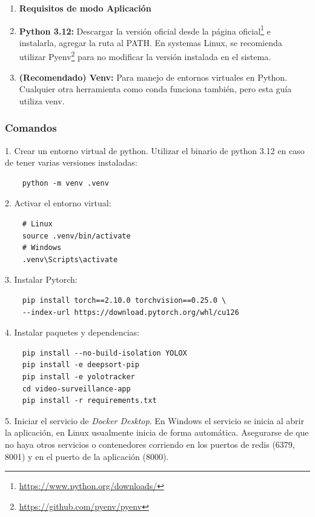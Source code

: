 \documentclass[11pt,a4paper]{article}
\begin{document}
\begin{enumerate}
    \item \textbf{Requisitos de modo Aplicación}
    \item \textbf{Python 3.12:} Descargar la versión oficial desde la página oficial\footnote{\url{https://www.python.org/downloads/}} e instalarla, agregar la ruta al PATH. En systemas Linux, se recomienda utilizar Pyenv\footnote{\url{https://github.com/pyenv/pyenv}} para no modificar la versión instalada en el sistema.
    \item \textbf{(Recomendado) Venv:} Para manejo de entornos virtuales en Python. Cualquier otra herramienta como conda funciona también, pero esta guía utiliza venv.
\end{enumerate}

\subsubsection{Comandos}

1. Crear un entorno virtual de python. Utilizar el binario de python 3.12 en caso de tener varias versiones instaladas:

\begin{verbatim}
    python -m venv .venv
\end{verbatim}

2. Activar el entorno virtual:

\begin{verbatim}
    # Linux
    source .venv/bin/activate
    # Windows
    .venv\Scripts\activate
\end{verbatim}

3. Instalar Pytorch:

\begin{verbatim}
    pip install torch==2.10.0 torchvision==0.25.0 \
    --index-url https://download.pytorch.org/whl/cu126
\end{verbatim}

4. Instalar paquetes y dependencias:

\begin{verbatim}
    pip install --no-build-isolation YOLOX
    pip install -e deepsort-pip
    pip install -e yolotracker
    cd video-surveillance-app
    pip install -r requirements.txt
\end{verbatim}

5. Iniciar el servicio de \textit{Docker Desktop}. En Windows el servicio se inicia al abrir la aplicación, en Linux usualmente inicia de forma automática. Asegurarse de que no haya otros servicios o contenedores corriendo en los puertos de redis (6379, 8001) y en el puerto de la aplicación (8000).
\end{document}
